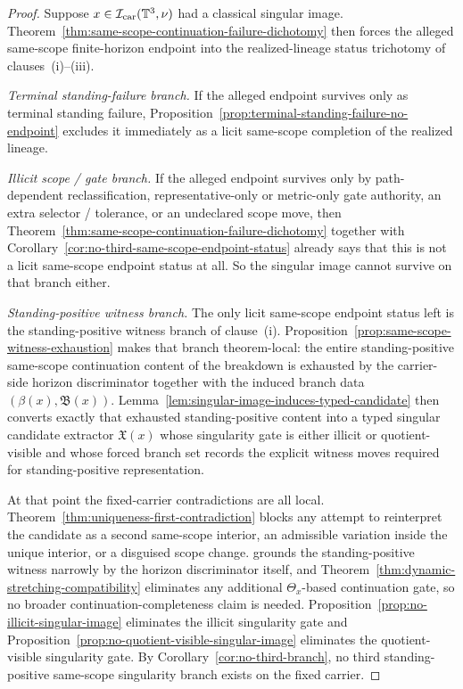 \begin{proof}
Suppose $x\in\mathcal I_{\mathrm{car}}(\mathbb{T}^3,\nu)$ had a classical singular image. Theorem~\ref{thm:same-scope-continuation-failure-dichotomy} then forces the alleged same-scope finite-horizon endpoint into the realized-lineage status trichotomy of clauses~(i)--(iii).

\smallskip
\noindent\textit{Terminal standing-failure branch.} If the alleged endpoint survives only as terminal standing failure, Proposition~\ref{prop:terminal-standing-failure-no-endpoint} excludes it immediately as a licit same-scope completion of the realized lineage.

\smallskip
\noindent\textit{Illicit scope / gate branch.} If the alleged endpoint survives only by path-dependent reclassification, representative-only or metric-only gate authority, an extra selector / tolerance, or an undeclared scope move, then Theorem~\ref{thm:same-scope-continuation-failure-dichotomy} together with Corollary~\ref{cor:no-third-same-scope-endpoint-status} already says that this is not a licit same-scope endpoint status at all. So the singular image cannot survive on that branch either.

\smallskip
\noindent\textit{Standing-positive witness branch.} The only licit same-scope endpoint status left is the standing-positive witness branch of clause~(i). Proposition~\ref{prop:same-scope-witness-exhaustion} makes that branch theorem-local: the entire standing-positive same-scope continuation content of the breakdown is exhausted by the carrier-side horizon discriminator together with the induced branch data $(\beta(x),\mathfrak B(x))$. Lemma~\ref{lem:singular-image-induces-typed-candidate} then converts exactly that exhausted standing-positive content into a typed singular candidate extractor $\mathfrak X(x)$ whose singularity gate is either illicit or quotient-visible and whose forced branch set records the explicit witness moves required for standing-positive representation.

At that point the fixed-carrier contradictions are all local. Theorem~\ref{thm:uniqueness-first-contradiction} blocks any attempt to reinterpret the candidate as a second same-scope interior, an admissible variation inside the unique interior, or a disguised scope change. \HorizonDetectabilityRef{} grounds the standing-positive witness narrowly by the horizon discriminator itself, and Theorem~\ref{thm:dynamic-stretching-compatibility} eliminates any additional $\Theta_x$-based continuation gate, so no broader continuation-completeness claim is needed. Proposition~\ref{prop:no-illicit-singular-image} eliminates the illicit singularity gate and Proposition~\ref{prop:no-quotient-visible-singular-image} eliminates the quotient-visible singularity gate. By Corollary~\ref{cor:no-third-branch}, no third standing-positive same-scope singularity branch exists on the fixed carrier.


\end{proof}
